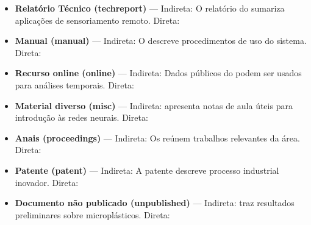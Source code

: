 \begin{itemize}
    \item \textbf{Relatório Técnico (techreport)} --- Indireta: O relatório do \textcite{techreport1} sumariza aplicações de sensoriamento remoto. Direta:\par

    \item \textbf{Manual (manual)} --- Indireta: O \textcite{manual1} descreve procedimentos de uso do sistema. Direta:\par

    \item \textbf{Recurso online (online)} --- Indireta: Dados públicos do \textcite{online1} podem ser usados para análises temporais. Direta:\par

    \item \textbf{Material diverso (misc)} --- Indireta: \textcite{misc1} apresenta notas de aula úteis para introdução às redes neurais. Direta:\par

    \item \textbf{Anais (proceedings)} --- Indireta: Os \textcite{proceedings1} reúnem trabalhos relevantes da área. Direta:\par

    \item \textbf{Patente (patent)} --- Indireta: A patente \textcite{patent1} descreve processo industrial inovador. Direta:\par

    \item \textbf{Documento não publicado (unpublished)} --- Indireta: \textcite{unpublished1} traz resultados preliminares sobre microplásticos. Direta:\par
\end{itemize}

